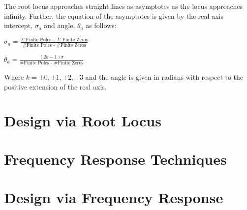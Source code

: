\documentclass[11pt]{article}
\begin{document}
    The root locus approaches straight lines as asymptotes as the locus approaches infinity. Further, the equation of the asymptotes is given by the real-axis intercept, $\sigma_a$ and angle, $\theta_a$ as follows:
    \begin{center}
        $\sigma_a = \frac{\Sigma \text{ Finite Poles} - \Sigma \text{ Finite Zeros}}{\text{\# Finite Poles - \# Finite Zeros}}$ 
    \end{center}

    \begin{center}
        $\theta_a = \frac{(2k - 1)\pi}{\text{\# Finite Poles - \# Finite Zeros}}$ 
    \end{center}

    Where $k = \pm 0, \pm 1, \pm 2, \pm 3$ and the angle is given in radians with respect to the positive
extension of the real axis.
    \section{Design via Root Locus}
    \section{Frequency Response Techniques}
    \section{Design via Frequency Response}
    
    
\end{document}
